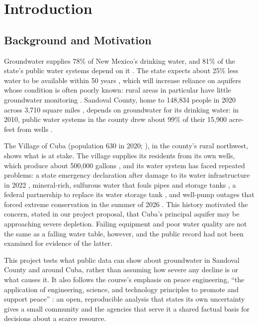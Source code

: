 \documentclass[10pt,twocolumn,letterpaper]{article}
\begin{document}
\section{Introduction}
\subsection{Background and Motivation}
Groundwater supplies 78\% of New Mexico's drinking water, and 81\% of the state's public water
systems depend on it \citep{cook2026}. The state expects about 25\% less water to be available
within 50 years \citep{nmgov2024}, which will increase reliance on aquifers whose condition is often
poorly known: rural areas in particular have little groundwater monitoring \citep{cook2026}.
Sandoval County, home to 148{,}834 people in 2020 across 3{,}710 square miles \citep{census_sandoval},
depends on groundwater for its drinking water: in 2010, public water systems in the county drew
about 99\% of their 15{,}900 acre-feet from wells \citep{ose_wateruse2010}.

The Village of Cuba (population 630 in 2020; \citealp{census_cuba}), in the county's rural northwest,
shows what is at stake. The village supplies its residents from its own wells, which produce
about 500{,}000 gallons \citep{hollinshead2021}, and its water system has faced repeated problems: a state
emergency declaration after damage to its water infrastructure in 2022 \citep{nmgov2022},
mineral-rich, sulfurous water that fouls pipes and storage tanks \citep{davis2020,hollinshead2021},
a federal partnership to replace its water storage tank \citep{usace2025}, and well-pump outages
that forced extreme conservation in the summer of 2026 \citep{cuba2026a,cuba2026b}. This history
motivated the concern, stated in our project proposal, that Cuba's principal aquifer may be
approaching severe depletion. Failing equipment and poor water quality are not the same as a
falling water table, however, and the public record had not been examined for evidence of the
latter.

This project tests what public data can show about groundwater in Sandoval County and around Cuba,
rather than assuming how severe any decline is or what causes it. It also follows the course's
emphasis on peace engineering, ``the application of engineering, science, and technology principles
to promote and support peace'' \citep{unm_peace}: an open, reproducible analysis that states its own
uncertainty gives a small community and the agencies that serve it a shared factual basis for
decisions about a scarce resource.
\end{document}
